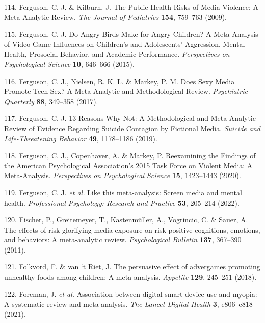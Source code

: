\documentclass[
  english,
  man]{apa6}
\newenvironment{cslreferences}%
  {}%
  {\par}
\begin{document}
\begin{cslreferences}
\leavevmode\hypertarget{ref-fergusonPublicHealthRisks2009}{}%
114. Ferguson, C. J. \& Kilburn, J. The Public Health Risks of Media Violence: A Meta-Analytic Review. \emph{The Journal of Pediatrics} \textbf{154}, 759--763 (2009).

\leavevmode\hypertarget{ref-fergusonAngryBirdsMake2015}{}%
115. Ferguson, C. J. Do Angry Birds Make for Angry Children? A Meta-Analysis of Video Game Influences on Children's and Adolescents' Aggression, Mental Health, Prosocial Behavior, and Academic Performance. \emph{Perspectives on Psychological Science} \textbf{10}, 646--666 (2015).

\leavevmode\hypertarget{ref-fergusonDoesSexyMedia2017}{}%
116. Ferguson, C. J., Nielsen, R. K. L. \& Markey, P. M. Does Sexy Media Promote Teen Sex? A Meta-Analytic and Methodological Review. \emph{Psychiatric Quarterly} \textbf{88}, 349--358 (2017).

\leavevmode\hypertarget{ref-ferguson13ReasonsWhy2019}{}%
117. Ferguson, C. J. 13 Reasons Why Not: A Methodological and Meta-Analytic Review of Evidence Regarding Suicide Contagion by Fictional Media. \emph{Suicide and Life-Threatening Behavior} \textbf{49}, 1178--1186 (2019).

\leavevmode\hypertarget{ref-fergusonReexaminingFindingsAmerican2020}{}%
118. Ferguson, C. J., Copenhaver, A. \& Markey, P. Reexamining the Findings of the American Psychological Association's 2015 Task Force on Violent Media: A Meta-Analysis. \emph{Perspectives on Psychological Science} \textbf{15}, 1423--1443 (2020).

\leavevmode\hypertarget{ref-fergusonThisMetaanalysisScreen2022}{}%
119. Ferguson, C. J. \emph{et al.} Like this meta-analysis: Screen media and mental health. \emph{Professional Psychology: Research and Practice} \textbf{53}, 205--214 (2022).

\leavevmode\hypertarget{ref-fischerEffectsRiskglorifyingMedia2011}{}%
120. Fischer, P., Greitemeyer, T., Kastenmüller, A., Vogrincic, C. \& Sauer, A. The effects of risk-glorifying media exposure on risk-positive cognitions, emotions, and behaviors: A meta-analytic review. \emph{Psychological Bulletin} \textbf{137}, 367--390 (2011).

\leavevmode\hypertarget{ref-folkvordPersuasiveEffectAdvergames2018}{}%
121. Folkvord, F. \& van `t Riet, J. The persuasive effect of advergames promoting unhealthy foods among children: A meta-analysis. \emph{Appetite} \textbf{129}, 245--251 (2018).

\leavevmode\hypertarget{ref-foremanAssociationDigitalSmart2021}{}%
122. Foreman, J. \emph{et al.} Association between digital smart device use and myopia: A systematic review and meta-analysis. \emph{The Lancet Digital Health} \textbf{3}, e806--e818 (2021).


\end{cslreferences}
\end{document}
